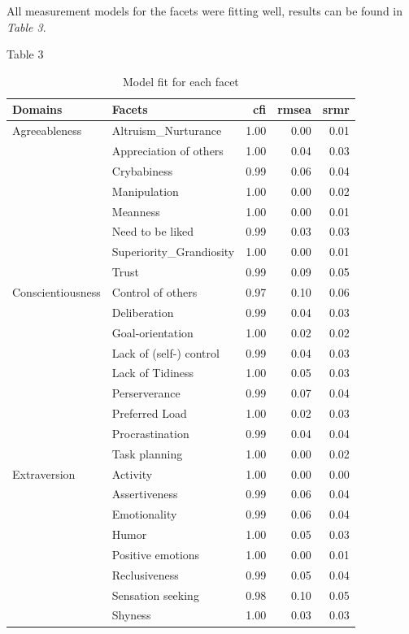 \documentclass[,man,floatsintext]{apa6}
\theoremstyle{definition}
\theoremstyle{definition}
\theoremstyle{definition}
\theoremstyle{remark}
\begin{document}
All measurement models for the facets were fitting well, results can be
found in \emph{Table 3}.

Table 3

\begin{table}[ht]
\centering
\caption{Model fit for each facet} 
\begingroup\fontsize{9.5pt}{9pt}\selectfont
\begin{tabular}{llrrr}
  \hline
Domains & Facets & cfi & rmsea & srmr \\ 
  \hline
Agreeableness & Altruism\_Nurturance & 1.00 & 0.00 & 0.01 \\ 
   & Appreciation of others & 1.00 & 0.04 & 0.03 \\ 
   & Crybabiness & 0.99 & 0.06 & 0.04 \\ 
   & Manipulation & 1.00 & 0.00 & 0.02 \\ 
   & Meanness & 1.00 & 0.00 & 0.01 \\ 
   & Need to be liked & 0.99 & 0.03 & 0.03 \\ 
   & Superiority\_Grandiosity & 1.00 & 0.00 & 0.01 \\ 
   & Trust & 0.99 & 0.09 & 0.05 \\ 
  Conscientiousness & Control of others & 0.97 & 0.10 & 0.06 \\ 
   & Deliberation & 0.99 & 0.04 & 0.03 \\ 
   & Goal-orientation & 1.00 & 0.02 & 0.02 \\ 
   & Lack of (self-) control & 0.99 & 0.04 & 0.03 \\ 
   & Lack of Tidiness & 1.00 & 0.05 & 0.03 \\ 
   & Perserverance & 0.99 & 0.07 & 0.04 \\ 
   & Preferred Load & 1.00 & 0.02 & 0.03 \\ 
   & Procrastination & 0.99 & 0.04 & 0.04 \\ 
   & Task planning & 1.00 & 0.00 & 0.02 \\ 
  Extraversion & Activity & 1.00 & 0.00 & 0.00 \\ 
   & Assertiveness & 0.99 & 0.06 & 0.04 \\ 
   & Emotionality & 0.99 & 0.06 & 0.04 \\ 
   & Humor & 1.00 & 0.05 & 0.03 \\ 
   & Positive emotions & 1.00 & 0.00 & 0.01 \\ 
   & Reclusiveness & 0.99 & 0.05 & 0.04 \\ 
   & Sensation seeking & 0.98 & 0.10 & 0.05 \\ 
   & Shyness & 1.00 & 0.03 & 0.03 \\ 

\end{tabular}
\end{table}
\end{document}
